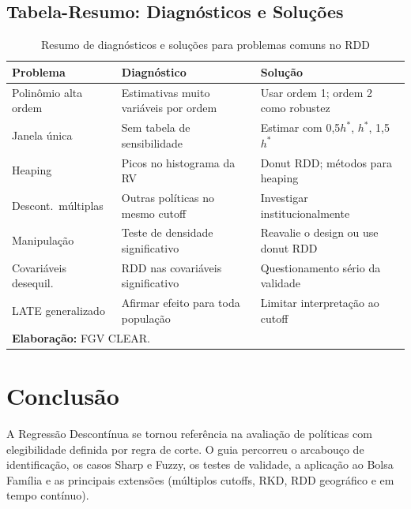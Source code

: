 \documentclass[12pt, a4paper, openany]{book}
\begin{document}
\section{Tabela-Resumo: Diagn\'osticos e Solu\c{c}\~oes}

\begin{table}[H]
\centering
\caption{Resumo de diagn\'osticos e solu\c{c}\~oes para problemas comuns no RDD}
\label{tab:diagnosticos}
\footnotesize
\begin{tabular}{p{3.5cm}p{4cm}p{5cm}}
\toprule
\textbf{Problema} & \textbf{Diagn\'ostico} & \textbf{Solu\c{c}\~ao} \\
\midrule
Polin\^omio alta ordem & Estimativas muito vari\'aveis por ordem & Usar ordem 1; ordem 2 como robustez \\
Janela \'unica & Sem tabela de sensibilidade & Estimar com 0{,}5$h^*$, $h^*$, 1{,}5$h^*$ \\
Heaping & Picos no histograma da RV & Donut RDD; m\'etodos para heaping \\
Descont.\ m\'ultiplas & Outras pol\'iticas no mesmo cutoff & Investigar institucionalmente \\
Manipula\c{c}\~ao & Teste de densidade significativo & Reavalie o design ou use donut RDD \\
Covari\'aveis desequil.\ & RDD nas covari\'aveis significativo & Questionamento s\'erio da validade \\
LATE generalizado & Afirmar efeito para toda popula\c{c}\~ao & Limitar interpreta\c{c}\~ao ao cutoff \\
\bottomrule
\multicolumn{3}{l}{\footnotesize \textbf{Elabora\c{c}\~ao:} FGV CLEAR.}
\end{tabular}
\end{table}


\chapter{Conclus\~ao}

A Regress\~ao Descont\'inua se tornou refer\^encia na avalia\c{c}\~ao de pol\'iticas com elegibilidade definida por regra de corte. O guia percorreu o arcabou\c{c}o de identifica\c{c}\~ao, os casos Sharp e Fuzzy, os testes de validade, a aplica\c{c}\~ao ao Bolsa Fam\'ilia e as principais extens\~oes (m\'ultiplos cutoffs, RKD, RDD geogr\'afico e em tempo cont\'inuo).
\end{document}

